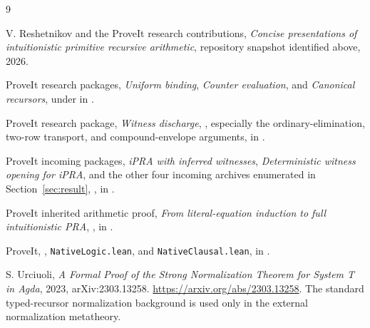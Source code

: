 \documentclass[11pt,letterpaper]{article}
\theoremstyle{definition}\newtheorem{definition}[theorem]{Definition}
\theoremstyle{remark}\newtheorem{remark}[theorem]{Remark}
\begin{document}
\begin{thebibliography}{9}
\small\raggedright
\setlength{\itemsep}{4pt}
V. Reshetnikov and the ProveIt research contributions,
\emph{Concise presentations of intuitionistic primitive recursive arithmetic},
repository snapshot identified above, 2026.

ProveIt research packages, \emph{Uniform binding},
\emph{Counter evaluation}, and \emph{Canonical recursors},
under  in \cite{repo}.

ProveIt research package, \emph{Witness discharge},
,
especially the ordinary-elimination, two-row transport, and
compound-envelope arguments, in \cite{repo}.

ProveIt incoming packages, \emph{iPRA with inferred witnesses},
\emph{Deterministic witness opening for iPRA}, and the other
four incoming archives enumerated in Section~\ref{sec:result},
, in \cite{repo}.

ProveIt inherited arithmetic proof,
\emph{From literal-equation induction to full intuitionistic PRA},
,
in \cite{repo}.

ProveIt, ,
\texttt{NativeLogic.lean}, and \texttt{NativeClausal.lean},
in \cite{repo}.

S. Urciuoli, \emph{A Formal Proof of the Strong Normalization
Theorem for System T in Agda}, 2023, arXiv:2303.13258.
\url{https://arxiv.org/abs/2303.13258}.
The standard typed-recursor normalization background is used
only in the external normalization metatheory.
\end{thebibliography}
\end{document}
